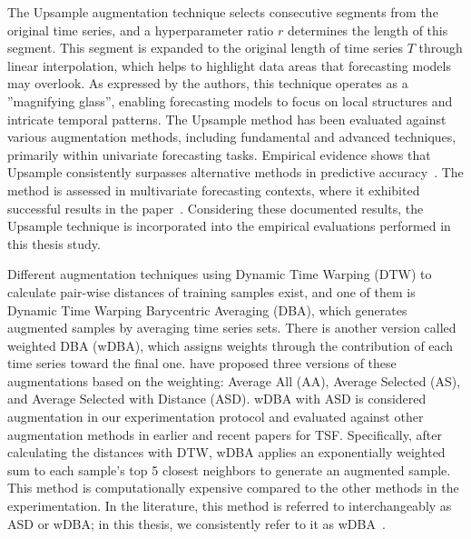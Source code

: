 The Upsample augmentation technique selects consecutive segments from the original time series, and a hyperparameter ratio $r$ determines the length of this segment. This segment is expanded to the original length of time series $T$ through linear interpolation, which helps to highlight data areas that forecasting models may overlook. As expressed by the authors, this technique operates as a ”magnifying glass”, enabling forecasting models to focus on local structures and intricate temporal patterns. The Upsample method has been evaluated against various augmentation methods, including fundamental and advanced techniques, primarily within univariate forecasting tasks. Empirical evidence shows that Upsample consistently surpasses alternative methods in predictive accuracy~\cite{upsample}. The method is assessed in multivariate forecasting contexts, where it exhibited successful results in the paper~\cite{zhao2024dominantshufflesimplepowerful}. Considering these documented results, the Upsample technique is incorporated into the empirical evaluations performed in this thesis study. 





Different augmentation techniques using Dynamic Time Warping (DTW) to calculate pair-wise distances of training samples exist, and one of them is Dynamic Time Warping Barycentric Averaging (DBA), which generates augmented samples by averaging time series sets. There is another version called weighted DBA (wDBA), which assigns weights through the contribution of each time series toward the final one. \cite{asd} have proposed three versions of these augmentations based on the weighting: Average All (AA), Average Selected (AS), and Average Selected with Distance (ASD). wDBA with ASD is considered augmentation in our experimentation protocol and evaluated against other augmentation methods in earlier and recent papers for TSF. Specifically, after calculating the distances with DTW, wDBA applies an exponentially weighted sum to each sample’s top 5 closest neighbors to generate an augmented sample. This method is computationally expensive compared to the other methods in the experimentation. In the literature, this method is referred to interchangeably as ASD or wDBA; in this thesis, we consistently refer to it as wDBA~\cite{asd, mbb, chen2023fraugfrequencydomainaugmentation, zhang2023diversecoherentaugmentationtimeseries, zhao2024dominantshufflesimplepowerful}.





